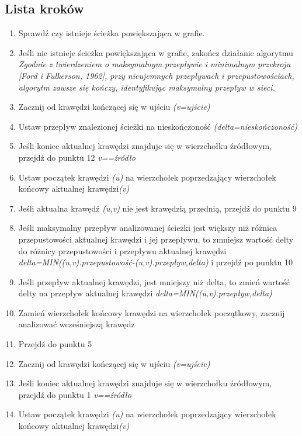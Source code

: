 \documentclass[10pt]{dokument-tiwo}
\begin{document}
\subsection{Lista kroków}
\begin{enumerate}
\item{Sprawdź czy istnieje ścieżka powiększająca w grafie.}
\item{Jeśli nie istnieje ścieżka powiększająca w grafie, zakończ działanie algorytmu}\\
  \emph{Zgodnie z twierdzeniem o maksymalnym przepływie i minimalnym przekroju [Ford i Fulkerson, 1962], przy nieujemnych przepływach i przepustowościach, algorytm zawsze się kończy, identyfikując maksymalny przepływ w sieci.}
\item{Zacznij od krawędzi kończącej się w ujściu \emph{(v=ujście)}}
\item{Ustaw przepływ znalezionej ścieżki na nieskończoność \emph{(delta=nieskończoność)}}
\item{Jeśli koniec aktualnej krawędzi znajduje się w wierzchołku źródłowym, przejdź do punktu 12 \emph{v==źródło}}
\item{Ustaw początek krawędzi \emph{(u)} na wierzchołek poprzedzający wierzchołek końcowy aktualnej krawędzi\emph{(v)}}
\item{Jeśli aktualna krawędź \emph{(u,v)} nie jest krawędzią przednią, przejdź do punktu 9}
\item{Jeśli maksymalny przepływ analizowanej ścieżki jest większy niż różnica przepustowości aktualnej krawędzi i jej przepływu, to zmniejsz wartość delty do różnicy przepustowości i przepływu aktualnej krawędzi
  \emph{delta=MIN((u,v).przepustowość-(u,v).przepływ,delta)} i przejdź po punktu 10}
\item{Jeśli przepływ aktualnej krawędzi, jest mniejszy niż delta, to zmień wartość delty na przepływ aktualnej krawędzi \emph{delta=MIN((u,v).przepływ,delta)}}
\item{Zamień wierzchołek końcowy krawędzi na wierzchołek początkowy, zacznij analizować wcześniejszą krawędz}
\item{Przejdź do punktu 5}
\item{Zacznij od krawędzi kończącej się w ujściu \emph{(v=ujście)}}
\item{Jeśli koniec aktualnej krawędzi znajduje się w wierzchołku źródłowym, przejdź do punktu 1 \emph{v==źródło}}
\item{Ustaw początek krawędzi \emph{(u)} na wierzchołek poprzedzający wierzchołek końcowy aktualnej krawędzi\emph{(v)}}

\end{enumerate}
\end{document}
